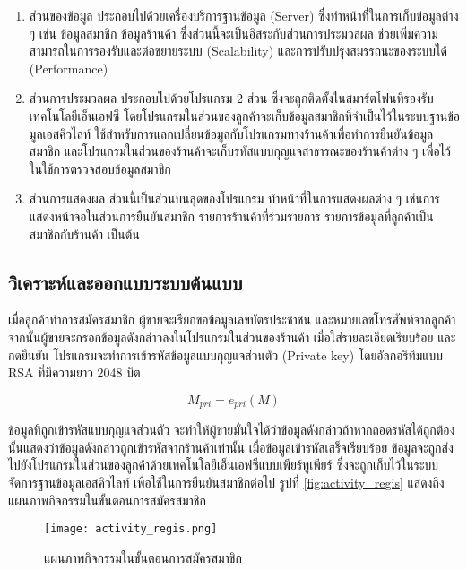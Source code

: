 \documentclass[a4paper]{article}
\begin{document}
\begin{enumerate} 
\item ส่วนของข้อมูล ประกอบไปด้วยเครื่องบริการฐานข้อมูล (Server) ซึ่งทำหน้าที่ในการเก็บข้อมูลต่าง ๆ เช่น ข้อมูลสมาชิก ข้อมูลร้านค้า ซึ่งส่วนนี้จะเป็นอิสระกับส่วนการประมวลผล ช่วยเพิ่มความสามารถในการรองรับและต่อขยายระบบ (Scalability) และการปรับปรุงสมรรถนะของระบบได้ (Performance)

\item ส่วนการประมวลผล ประกอบไปด้วยโปรแกรม 2 ส่วน ซึ่งจะถูกติดตั้งในสมาร์ตโฟนที่รองรับเทคโนโลยีเอ็นเอฟซี โดยโปรแกรมในส่วนของลูกค้าจะเก็บข้อมูลสมาชิกที่จำเป็นไว้ในระบบฐานข้อมูลเอสคิวไลท์ ใช้สำหรับการแลกเปลี่ยนข้อมูลกับโปรแกรมทางร้านค้าเพื่อทำการยืนยันข้อมูลสมาชิก และโปรแกรมในส่วนของร้านค้าจะเก็บรหัสแบบกุญแจสาธารณะของร้านค้าต่าง ๆ เพื่อไว้ในใช้การตรวจสอบข้อมูลสมาชิก

\item ส่วนการแสดงผล ส่วนนี้เป็นส่วนบนสุดของโปรแกรม ทำหน้าที่ในการแสดงผลต่าง ๆ เช่นการแสดงหน้าจอในส่วนการยืนยันสมาชิก รายการร้านค้าที่ร่วมรายการ รายการข้อมูลที่ลูกค้าเป็นสมาชิกกับร้านค้า เป็นต้น
\end{enumerate}


\subsection{วิเคราะห์และออกแบบระบบต้นแบบ}
เมื่อลูกค้าทำการสมัครสมาชิก ผู้ขายจะเรียกขอข้อมูลเลขบัตรประชาชน และหมายเลขโทรศัพท์จากลูกค้า จากนั้นผู้ขายจะกรอกข้อมูลดังกล่าวลงในโปรแกรมในส่วนของร้านค้า เมื่อใส่รายละเอียดเรียบร้อย และกดยืนยัน โปรแกรมจะทำการเข้ารหัสข้อมูลแบบกุญแจส่วนตัว (Private key) โดยอัลกอริทึมแบบ RSA ที่มีความยาว 2048 บิต 

\begin{equation}M_{pri} = e_{pri}(M)\end{equation}

\noindent ข้อมูลที่ถูกเข้ารหัสแบบกุญแจส่วนตัว จะทำให้ผู้ขายมั่นใจได้ว่าข้อมูลดังกล่าวถ้าหากถอดรหัสได้ถูกต้อง นั้นแสดงว่าข้อมูลดังกล่าวถูกเข้ารหัสจากร้านค้าเท่านั้น เมื่อข้อมูลเข้ารหัสเสร็จเรียบร้อย ข้อมูลจะถูกส่งไปยังโปรแกรมในส่วนของลูกค้าด้วยเทคโนโลยีเอ็นเอฟซีแบบเพียร์ทูเพียร์ ซึ่งจะถูกเก็บไว้ในระบบจัดการฐานข้อมูลเอสคิวไลท์ เพื่อใช้ในการยืนยันสมาชิกต่อไป รูปที่ \ref{fig:activity_regis} แสดงถึงแผนภาพกิจกรรมในขั้นตอนการสมัครสมาชิก

\begin{figure}[ht!]
\centering
\texttt{[image: activity\_regis.png]}
\caption{แผนภาพกิจกรรมในขั้นตอนการสมัครสมาชิก} \label{fig:activity_regis}
\label{overflow}
\end{figure}
\end{document}

